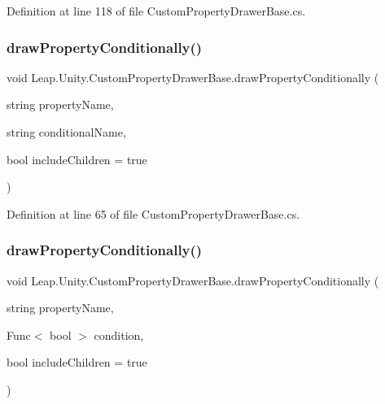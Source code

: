 Definition at line 118 of file Custom\+Property\+Drawer\+Base.\+cs.

\mbox{\label{class_leap_1_1_unity_1_1_custom_property_drawer_base_ae8ffab0ab4a37260bbd0855e530c21f3}} 
\subsubsection{\texorpdfstring{drawPropertyConditionally()}{drawPropertyConditionally()}\hspace{0.1cm}{\footnotesize\ttfamily [1/2]}}
{\footnotesize\ttfamily void Leap.\+Unity.\+Custom\+Property\+Drawer\+Base.\+draw\+Property\+Conditionally (\begin{DoxyParamCaption}\item[{string}]{property\+Name,  }\item[{string}]{conditional\+Name,  }\item[{bool}]{include\+Children = {\ttfamily true} }\end{DoxyParamCaption})\hspace{0.3cm}{\ttfamily [protected]}}



Definition at line 65 of file Custom\+Property\+Drawer\+Base.\+cs.

\mbox{\label{class_leap_1_1_unity_1_1_custom_property_drawer_base_ab4f0ecabdcb89d099b1b9ad6c71f1e0d}} 
\subsubsection{\texorpdfstring{drawPropertyConditionally()}{drawPropertyConditionally()}\hspace{0.1cm}{\footnotesize\ttfamily [2/2]}}
{\footnotesize\ttfamily void Leap.\+Unity.\+Custom\+Property\+Drawer\+Base.\+draw\+Property\+Conditionally (\begin{DoxyParamCaption}\item[{string}]{property\+Name,  }\item[{Func$<$ bool $>$}]{condition,  }\item[{bool}]{include\+Children = {\ttfamily true} }\end{DoxyParamCaption})\hspace{0.3cm}{\ttfamily [protected]}}



